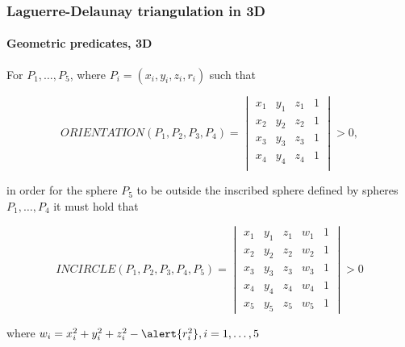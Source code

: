 \documentclass[c, 10pt]{beamer}
\begin{document}
\begin{frame}\frametitle{Laguerre-Delaunay triangulation in 3D}\framesubtitle{Geometric predicates, 3D}
\begin{small}
For $P_1, \dots, P_5$, where $P_i = (x_i, y_i, z_i, r_i)$ such that

$$ORIENTATION(P_1,P_2,P_3,P_4) = 
\begin{vmatrix} 
x_1 & y_1 & z_1 & 1 \\
x_2 & y_2 & z_2 & 1 \\
x_3 & y_3 & z_3 & 1 \\
x_4 & y_4 & z_4 & 1 \\
\end{vmatrix} > 0,$$

in order for the sphere $P_5$ to be outside the inscribed sphere defined by spheres $P_1, \dots, P_4$ it must hold that

$$INCIRCLE(P_1,P_2,P_3,P_4, P_5) = \begin{vmatrix} x_1 & y_1 & z_1 & w_1 & 1 \\
x_2 & y_2 & z_2 & w_2 & 1 \\
x_3 & y_3 & z_3 & w_3 & 1 \\
x_4 & y_4 & z_4 & w_4 & 1 \\
x_5 & y_5 & z_5 & w_5 & 1\end{vmatrix}> 0$$

where $w_i = x_i^2  + y_i^2 + z_i^2 - \alert{r_i^2}, i = 1,\dots, 5$




\end{small}
\end{frame}
\end{document}
